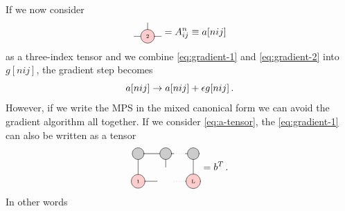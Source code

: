 \documentclass[twoside,twocolumn,9pt]{article}
\begin{document}
If we now consider 
\begin{equation}
  \begin{tikzpicture}[baseline={([yshift=-.5ex]current bounding box.center)}]
    \draw[gray, thick] (0,0) -- (1,0);
    \draw[gray, thick] (0.5,0) -- (0.5,0.5);
    \node[draw, circle, line cap=round, fill=red!20] at (0.5,0) {\tiny 2};
  \end{tikzpicture} = A^n_{ij} \equiv a[nij] 
\end{equation}
as a three-index tensor and we combine \cref{eq:gradient-1} and \cref{eq:gradient-2} into $g[nij]$, the gradient step becomes
\begin{equation}\label{eq:a-tensor}
  a[nij] \rightarrow a[nij] + \epsilon g[nij] \thinspace .
\end{equation}
However, if we write the MPS in the mixed canonical form we can avoid the gradient algorithm all together. If we consider \cref{eq:a-tensor}, the \cref{eq:gradient-1} can also be written as a tensor
\begin{equation}\label{eq:gradient-1-as-tensor}
  \begin{tikzpicture}[baseline={([yshift=-.5ex]current bounding box.center)}]
    \draw[gray, thick] (0,0) -- (0,-1);
    \draw[gray, thick] (1,0) -- (1,-0.5);
    \draw[gray, thick] (2,0) -- (2,-1);

    \draw[gray, thick] (0,0) -- (1.3,0);
    \draw[gray, dotted] (1.3,0) -- (1.7,0);
    \draw[gray, thick] (1.7,0) -- (2.0,0);

    \draw[gray, thick] (0,-1) -- (0.7,-1);
    \draw[gray, dotted] (1.3,-1) -- (1.7,-1);
    \draw[gray, thick] (1.7,-1) -- (2.0,-1);

    \node[draw, circle, line cap=round, fill=black!20, minimum size=12] at (0,0) {  };
    \node[draw, circle, line cap=round, fill=black!20, minimum size=12] at (1,0) {  };
    \node[draw, circle, line cap=round, fill=black!20, minimum size=12] at (2,0) {  };

    \node[draw, circle, line cap=round, fill=red!20] at (0,-1) {\tiny 1};
    \node[draw, circle, line cap=round, fill=red!20] at (2,-1) {\tiny L};
  \end{tikzpicture} = b^T \thinspace .
\end{equation} 
In other words 
\end{document}
